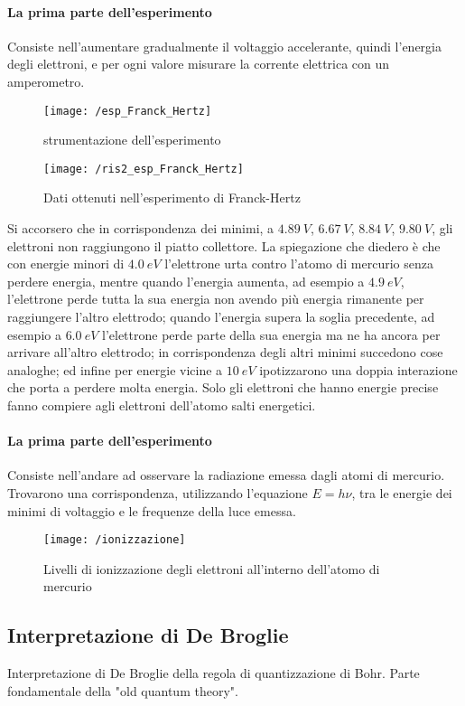 \paragraph{La prima parte dell'esperimento}
Consiste nell'aumentare gradualmente il voltaggio accelerante, quindi l'energia degli elettroni, e per ogni valore misurare la corrente elettrica con un amperometro.
\begin{figure}[h]
\centering
\texttt{[image: /esp\_Franck\_Hertz]}
\caption{strumentazione dell'esperimento}
\end{figure}
\begin{figure}[h]
\centering
\texttt{[image: /ris2\_esp\_Franck\_Hertz]}
\caption{Dati ottenuti nell'esperimento di Franck-Hertz}
\end{figure}
Si accorsero che in corrispondenza dei minimi, a $\SI{4.89}{V}$, $\SI{6.67}{V}$, $\SI{8.84}{V}$, $\SI{9.80}{V}$, gli elettroni non raggiungono il piatto collettore.
La spiegazione che diedero è che con energie minori di $\SI{4.0}{eV}$ l'elettrone urta contro l'atomo di mercurio senza perdere energia, mentre quando l'energia aumenta, ad esempio a $\SI{4.9}{eV}$, l'elettrone perde tutta la sua energia non avendo più energia rimanente per raggiungere l'altro elettrodo; quando l'energia supera la soglia precedente, ad esempio a $\SI{6.0}{eV}$ l'elettrone perde parte della sua energia ma ne ha ancora per arrivare all'altro elettrodo; in corrispondenza degli altri minimi succedono cose analoghe; ed infine per energie vicine a $\SI{10}{eV}$ ipotizzarono una doppia interazione che porta a perdere molta energia.
Solo gli elettroni che hanno energie precise fanno compiere agli elettroni dell'atomo salti energetici.
\paragraph{La prima parte dell'esperimento} 
Consiste nell'andare ad osservare la radiazione emessa dagli atomi di mercurio.
Trovarono una corrispondenza, utilizzando l'equazione $E=h\nu$, tra le energie dei minimi di voltaggio e le frequenze della luce emessa.
\begin{figure}[h]
\centering
\texttt{[image: /ionizzazione]}
\caption{Livelli di ionizzazione degli elettroni all'interno dell'atomo di mercurio}
\end{figure}

\newpage
\subsection{Interpretazione di De Broglie}
Interpretazione di De Broglie della regola di quantizzazione di Bohr.
Parte fondamentale della "old quantum theory".

